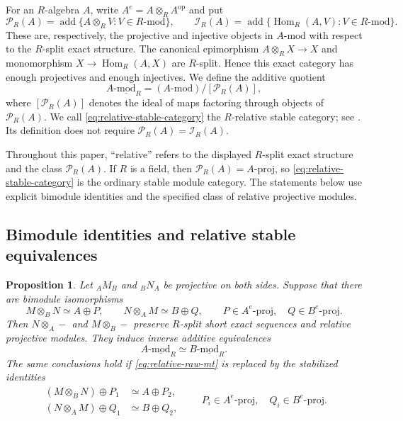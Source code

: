\documentclass[12pt,a4paper,english,reqno]{amsart}
\numberwithin{equation}{section}
\theoremstyle{plain}
\newtheorem{proposition}[theorem]{Proposition}
\theoremstyle{definition}
\begin{document}
For an $R$-algebra $A$, write
$A^e=A\otimes_RA^{\mathrm{op}}$ and put
\[
 \mathcal P_R(A)
   =\operatorname{add}\{A\otimes_RV:V\in R\text{-}\mathrm{mod}\},
 \qquad
 \mathcal I_R(A)
   =\operatorname{add}\{\operatorname{Hom}_R(A,V):
                                    V\in R\text{-}\mathrm{mod}\}.
\]
These are, respectively, the projective and injective objects in
$A\text{-}\mathrm{mod}$ with respect to the $R$-split exact structure.
The canonical epimorphism
$A\otimes_RX\to X$ and monomorphism
$X\to\operatorname{Hom}_R(A,X)$ are $R$-split.  Hence this exact
category has enough projectives and enough injectives.  We define the additive quotient
\begin{equation}
 A\text{-}\underline{\mathrm{mod}}_R
    =(A\text{-}\mathrm{mod})/[\mathcal P_R(A)],
 \label{eq:relative-stable-category}
\end{equation}
where $[\mathcal P_R(A)]$ denotes the ideal of maps factoring
through objects of $\mathcal P_R(A)$.  We call
\eqref{eq:relative-stable-category} the $R$-relative stable category;
see \cite[Section~2]{Linckelmann2025}.  Its definition does not require
$\mathcal P_R(A)=\mathcal I_R(A)$.

Throughout this paper, ``relative'' refers to the displayed
$R$-split exact structure and the class $\mathcal P_R(A)$.
If $R$ is a field,
then $\mathcal P_R(A)=A\text{-}\mathrm{proj}$, so
\eqref{eq:relative-stable-category} is the ordinary stable module
category. The statements below use explicit bimodule identities
and the specified class of relative projective modules.

\subsection{Bimodule identities and relative stable equivalences}

\begin{proposition}\label{prop:relative-morita-bimodules}
Let ${}_AM_B$ and ${}_BN_A$ be projective on both sides.  Suppose that
there are bimodule isomorphisms
\begin{equation}
 M\otimes_BN\simeq A\oplus P,
 \qquad N\otimes_AM\simeq B\oplus Q,
 \qquad P\in A^e\text{-}\mathrm{proj},\quad
        Q\in B^e\text{-}\mathrm{proj}.
 \label{eq:relative-raw-mt}
\end{equation}
Then $N\otimes_A-$ and $M\otimes_B-$ preserve $R$-split short
exact sequences and relative projective modules.  They induce
inverse additive equivalences
\[
 A\text{-}\underline{\mathrm{mod}}_R
       \simeq B\text{-}\underline{\mathrm{mod}}_R.
\]
The same conclusions hold if \eqref{eq:relative-raw-mt} is replaced
by the stabilized identities
\begin{equation}
 \begin{split}
 (M\otimes_BN)\oplus P_1&\simeq A\oplus P_2,\\
 (N\otimes_AM)\oplus Q_1&\simeq B\oplus Q_2,
 \end{split}
 \qquad
 P_i\in A^e\text{-}\mathrm{proj},\quad
 Q_i\in B^e\text{-}\mathrm{proj}.
 \label{eq:relative-stabilized-mt}
\end{equation}
\end{proposition}
\end{document}
